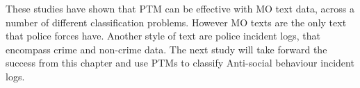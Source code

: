 These studies have shown that PTM can be effective with MO text data, across a number of different classification problems. However MO texts are the only text that police forces have. Another style of text are police incident logs, that encompass crime and non-crime data. The next study will take forward the success from this chapter and use PTMs to classify Anti-social behaviour incident logs.






